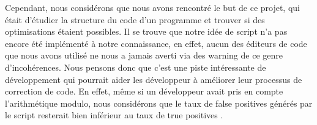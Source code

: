 Cependant, nous considérons que nous avons rencontré le but de ce projet, qui était d'étudier la structure du code d'un programme et trouver si des optimisations étaient possibles. Il se trouve que notre idée de script n'a pas encore été implémenté à notre connaissance, en effet, aucun des éditeurs de code que nous avons utilisé ne nous a jamais averti via des warning de ce genre d'incohérences. Nous pensons donc que c'est une piste intéressante de développement qui pourrait aider les développeur à améliorer leur processus de correction de code. En effet, même si un développeur avait pris en compte l'arithmétique modulo, nous considérons que le taux de \og false positives \fg{} générés par le script resterait bien inférieur au taux de \og true positives \fg{}.